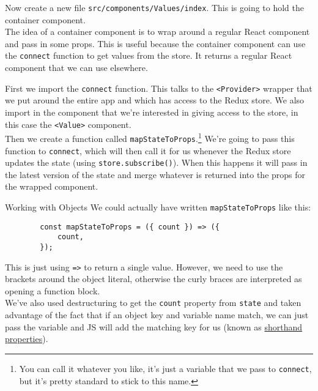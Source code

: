 Now create a new file \texttt{src/components/Values/index}. This is going to hold the container component.
\\

The idea of a container component is to wrap around a regular React component and pass in some props. This is useful because the container component can use the \texttt{connect} function to get values from the store. It returns a regular React component that we can use elsewhere.


First we import the \texttt{connect} function. This talks to the \texttt{<Provider>} wrapper that we put around the entire app and which has access to the Redux store. We also import in the component that we're interested in giving access to the store, in this case the \texttt{<Value>} component.
\\

Then we create a function called \texttt{mapStateToProps}.\footnote{You can call it whatever you like, it's just a variable that we pass to \texttt{connect}, but it's pretty standard to stick to this name.} We're going to pass this function to \texttt{connect}, which will then call it for us whenever the Redux store updates the state (using \texttt{store.subscribe()}). When this happens it will pass in the latest version of the state and merge whatever is returned into the props for the wrapped component.
\\



\par\bigskip


\pagebreak

\begin{infobox}{Working with Objects}
    We could actually have written \texttt{mapStateToProps} like this:

    \begin{verbatim}
        const mapStateToProps = ({ count }) => ({
            count,
        });
    \end{verbatim}

    This is just using \texttt{=>} to return a single value. However, we need to use the brackets around the object literal, otherwise the curly braces are interpreted as opening a function block.
    \\

    We've also used destructuring to get the \texttt{count} property from \texttt{state} and taken advantage of the fact that if an object key and variable name match, we can just pass the variable and JS will add the matching key for us (known as \href{https://ariya.io/2013/02/es6-and-object-literal-property-value-shorthand}{shorthand properties}).
\end{infobox}

